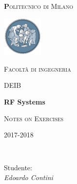 \begin{titlepage}

	\centering
	{\scshape\huge\textbf Politecnico di Milano \par}
	\vspace{0.5cm}

	\includegraphics[width=0.15\textwidth]{Immagini/logo.png}\par\vspace{0.2cm}
	
	{\scshape\small Facoltà di ingegneria\par}
	{\scshape\small DEIB\par}
	\vspace{1.5cm}
	{\huge\bfseries RF Systems\par}
	\vspace{1.5cm}
	{\scshape Notes on Exercises\par}
	{\scshape\small 2017-2018 \par}
	\vspace{2cm}
	\vfill
    \\[1cm]
	
	\raggedright
    {Studente:\\ \textit{Edoardo Contini}
	
	}\vfill
	
	\end{titlepage}
